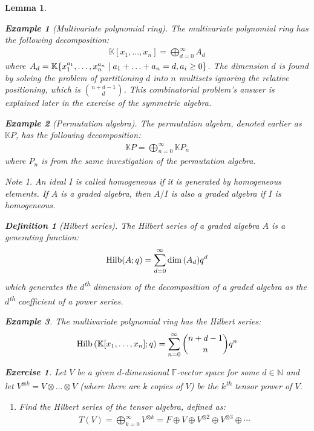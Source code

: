 \documentclass{article}
\newtheorem{Lemma}{Lemma}
\theoremstyle{definition}
\newtheorem{Definition}{Definition}
\newtheorem*{Example*}{Example}
\newtheorem{Exercise}{Exercise}
\theoremstyle{remark}
\newtheorem*{Note*}{Note}
\theoremstyle{underline}
\theoremstyle{underline}
\DeclareMathOperator{\Hilb}{Hilb}
\renewcommand{\th}{\textsuperscript{th}\xspace}
\begin{document}
\begin{Lemma}
	\begin{Example*}[Multivariate polynomial ring]
		The multivariate polynomial ring has the following decomposition:
		\begin{gather*}
			\mathbb K[x_1,\ldots,x_n] = \bigoplus_{d=0}^{\infty} A_d
		\end{gather*}
		where $A_d = \mathbb K\qty{x_1^{a_1},\ldots, x_n^{a_n}\mid a_1 + \ldots + a_n = d, a_i \geq 0}$. The dimension $d$ is found by solving the problem of partitioning $d$ into $n$ multisets ignoring the relative positioning, which is $\binom{n+d-1}{d}$. This combinatorial problem's answer is explained later in the exercise of the \emph{symmetric algebra}.
	\end{Example*}

	\begin{Example*}[Permutation algebra]
		The permutation algebra, denoted earlier as $\mathbb KP$, has the following decomposition:
		\begin{gather*}
			\mathbb KP = \bigoplus_{n=0}^{\infty} \mathbb KP_n
		\end{gather*}
		where $P_n$ is from the same investigation of the permutation algebra.
	\end{Example*}

	\begin{Note*}
		An ideal $I$ is called \emph{homogeneous} if it is generated by homogeneous elements. If $A$ is a graded algebra, then $A/I$ is also a graded algebra if $I$ is homogeneous.
	\end{Note*}

	\begin{Definition}[Hilbert series]
		The \emph{Hilbert series} of a graded algebra $A$ is a generating function:
		\begin{gather*}
			\Hilb(A; q) = \sum_{d=0}^{\infty} \dim\pqty{A_d} q^d
		\end{gather*}
		which generates the $d$\th dimension of the decomposition of a graded algebra as the $d$\th coefficient of a power series.
	\end{Definition}

	\begin{Example*}
		The multivariate polynomial ring has the Hilbert series:
		\begin{gather*}
			\Hilb\pqty{\mathbb K[x_1,\ldots, x_n]; q} = \sum_{n=0}^{\infty} \binom{n + d - 1}{n} q^n
		\end{gather*}
	\end{Example*}

	\begin{Exercise}
		Let $V$ be a given $d$-dimensional $\mathbb F$-vector space for some $d \in \mathbb N$ and let $V^{\otimes k} = V \otimes \dots \otimes V$ (where there are $k$ copies of $V$) be the \emph{$k$\th tensor power of $V$}.
		\begin{enumerate}[label=(\alph*)]
			\item Find the Hilbert series of the \emph{tensor algebra}, defined as:
			\begin{gather*}
				T(V) = \bigoplus_{k=0}^{\infty} V^{\otimes k} = F \oplus V \oplus V^{\otimes 2} \oplus V^{\otimes 3} \oplus \cdots
			\end{gather*}			


\end{enumerate}
\end{Exercise}
\end{Lemma}
\end{document}
